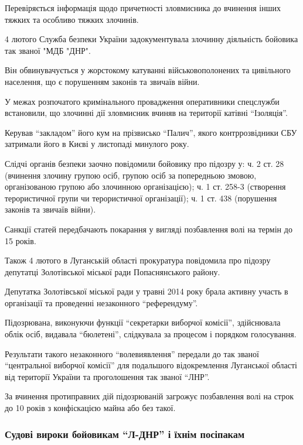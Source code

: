 Перевіряється інформація щодо причетності зловмисника до вчинення інших тяжких
та особливо тяжких злочинів.

4 лютого Служба безпеки України задокументувала злочинну діяльність бойовика
так званої "МДБ "ДНР".

Він обвинувачується у жорстокому катуванні військовополонених та цивільного
населення, що є порушенням законів та звичаїв війни.

У межах розпочатого кримінального провадження оперативники спецслужби
встановили, що злочинні дії зловмисник вчиняв на території катівні \enquote{Ізоляція}.

Керував \enquote{закладом} його кум на прізвисько \enquote{Палич}, якого контррозвідники СБУ
затримали його в Києві у листопаді минулого року.

Слідчі органів безпеки заочно повідомили бойовику про підозру у: ч. 2 ст. 28
(вчинення злочину групою осіб, групою осіб за попередньою змовою, організованою
групою або злочинною організацією); ч. 1 ст. 258-3 (створення терористичної
групи чи терористичної організації); ч. 1 ст. 438 (порушення законів та звичаїв
війни).

Санкції статей передбачають покарання у вигляді позбавлення волі на термін до
15 років.

Також 4 лютого в Луганській області прокуратура повідомила про підозру
депутатці Золотівської міської ради Попаснянського району.

Депутатка Золотівської міської ради у травні 2014 року брала активну участь в
організації та проведенні незаконного \enquote{референдуму}.

Підозрювана, виконуючи функції \enquote{секретарки виборчої комісії}, здійснювала облік
осіб, видавала \enquote{бюлетені}, слідкувала за процесом і порядком голосування.

Результати такого незаконного \enquote{волевиявлення} передали до так званої
\enquote{центральної виборчої комісії} для подальшого відокремлення Луганської області
від території України та проголошення так званої \enquote{ЛНР}.

За вчинення протиправних дій підозрюваній загрожує позбавлення волі на строк до
10 років з конфіскацією майна або без такої.

\subsubsection{Судові вироки бойовикам \enquote{Л-ДНР} і їхнім посіпакам}

